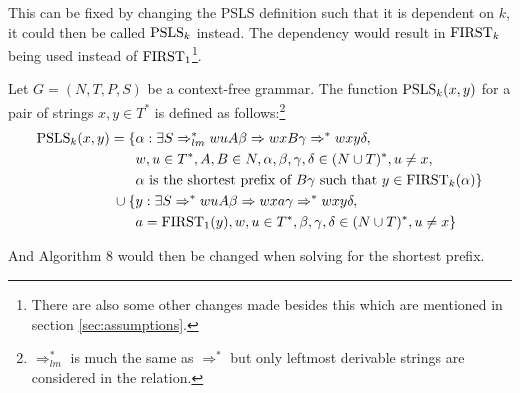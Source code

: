 This can be fixed by changing the PSLS definition such that it is dependent on $k$, it could then be called $\PSLS_k$ instead. The dependency would result in $\text{FIRST}_k$ being used instead of $\text{FIRST}_1$\footnote{There are also some other changes made besides this which are mentioned in section \ref{sec:assumptions}.}.
\begin{definition}[$\PSLS_k$]
    Let $G = (N, T, P, S)$ be a context-free grammar. The function $\text{PSLS}_k(x, y)$ for a pair of strings $x, y \in T^*$ is defined as follows:\footnote{$\Rightarrow_{lm}^*$ is much the same as $\Rightarrow^*$ but only leftmost derivable strings are considered in the relation.}
    \begin{align*}
        \text{PSLS}_k(x, y) = \{ & \alpha : \exists S \Rightarrow^*_{lm} wuA\beta \Rightarrow wxB\gamma \Rightarrow^* wxy\delta, \\
        & w, u \in T^*, A, B \in N, \alpha, \beta, \gamma, \delta \in (N \cup T)^*, u \neq x, \\
        & \alpha \text{ is the shortest prefix of } B\gamma \text{ such that } y \in \text{FIRST}_k(\alpha) \} \\
        \cup \: \{ & y : \exists S \Rightarrow^* wuA\beta \Rightarrow wxa\gamma \Rightarrow^* wxy\delta, \\
        & a = \text{FIRST}_1(y), w,u \in T^*, \beta, \gamma, \delta \in (N \cup T)^*, u \neq x \}
    \end{align*}
\end{definition}
\noindent And Algorithm 8 would then be changed when solving for the shortest prefix.
